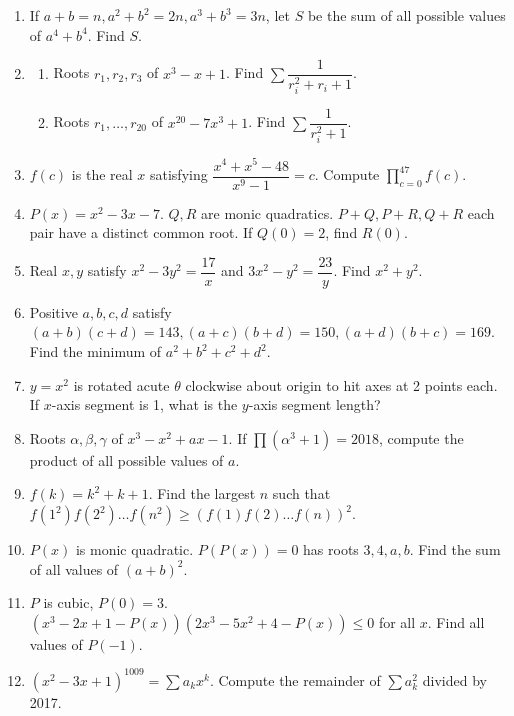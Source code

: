 \documentclass[12pt]{scrartcl}
\begin{document}
\begin{enumerate}
    \item If $a+b=n, a^2+b^2=2n, a^3+b^3=3n$, let $S$ be the sum of all possible values of $a^4+b^4$. Find $S$.

    \item 
    \begin{enumerate}
        \item Roots $r_1,r_2,r_3$ of $x^3-x+1$. Find $\sum \dfrac{1}{r_i^2+r_i+1}$.
        \item Roots $r_1, \dots, r_{20}$ of $x^{20}-7x^3+1$. Find $\sum \dfrac{1}{r_i^2+1}$.
    \end{enumerate}

    \item $f(c)$ is the real $x$ satisfying $\dfrac{x^4+x^5-48}{x^9-1}=c$. Compute $\prod_{c=0}^{47} f(c)$.

    \item $P(x)=x^2-3x-7$. $Q,R$ are monic quadratics. $P+Q, P+R, Q+R$ each pair have a distinct common root. If $Q(0)=2$, find $R(0)$.


    \item Real $x,y$ satisfy $x^2-3y^2=\dfrac{17}{x}$ and $3x^2-y^2=\dfrac{23}{y}$. Find $x^2+y^2$.

    \item Positive $a,b,c,d$ satisfy $(a+b)(c+d)=143, (a+c)(b+d)=150, (a+d)(b+c)=169$. Find the minimum of $a^2+b^2+c^2+d^2$.

    \item $y=x^2$ is rotated acute $\theta$ clockwise about origin to hit axes at 2 points each. If $x$-axis segment is 1, what is the $y$-axis segment length?

    \item Roots $\alpha, \beta, \gamma$ of $x^3-x^2+ax-1$. If $\prod (\alpha^3+1) = 2018$, compute the product of all possible values of $a$.

    \item $f(k)=k^2+k+1$. Find the largest $n$ such that $f(1^2)f(2^2)\dots f(n^2) \ge (f(1)f(2)\dots f(n))^2$.

    \item $P(x)$ is monic quadratic. $P(P(x))=0$ has roots $3,4,a,b$. Find the sum of all values of $(a+b)^2$.
    
    \item $P$ is cubic, $P(0)=3$. $(x^3-2x+1-P(x))(2x^3-5x^2+4-P(x)) \le 0$ for all $x$. Find all values of $P(-1)$.

    \item $(x^2-3x+1)^{1009} = \sum a_k x^k$. Compute the remainder of $\sum a_k^2$ divided by 2017.


\end{enumerate}
\end{document}
